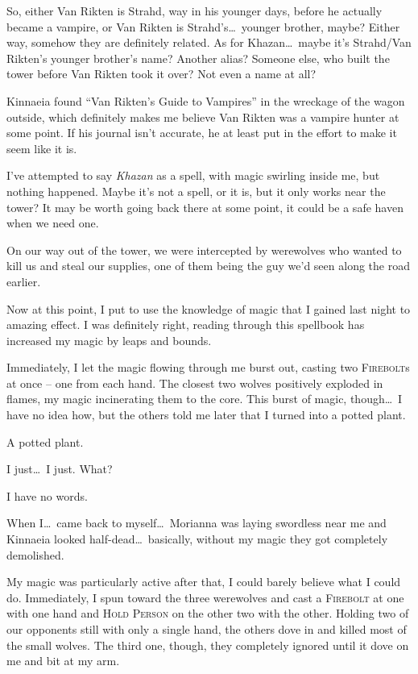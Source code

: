 So, either Van Rikten is Strahd, way in his younger days, before he actually became a vampire, or Van Rikten is Strahd's\dots\ younger brother, maybe? Either way, somehow they are definitely related. As for Khazan\dots\ maybe it's Strahd/Van Rikten's younger brother's name? Another alias? Someone else, who built the tower before Van Rikten took it over? Not even a name at all?

Kinnaeia found ``Van Rikten's Guide to Vampires'' in the wreckage of the wagon outside, which definitely makes me believe Van Rikten was a vampire hunter at some point. If his journal isn't accurate, he at least put in the effort to make it seem like it is.

I've attempted to say \emph{Khazan} as a spell, with magic swirling inside me, but nothing happened. Maybe it's not a spell, or it is, but it only works near the tower? It may be worth going back there at some point, it could be a safe haven when we need one.

On our way out of the tower, we were intercepted by werewolves who wanted to kill us and steal our supplies, one of them being the guy we'd seen along the road earlier.

Now at this point, I put to use the knowledge of magic that I gained last night to amazing effect. I was definitely right, reading through this spellbook has increased my magic by leaps and bounds.

Immediately, I let the magic flowing through me burst out, casting two \textsc{Firebolt}s at once -- one from each hand. The closest two wolves positively exploded in flames, my magic incinerating them to the core. This burst of magic, though\dots\ I have no idea how, but the others told me later that I turned into a potted plant.

A potted plant.

I just\dots\ I just. What?

I have no words.

When I\dots\ came back to myself\dots\ Morianna was laying swordless near me and Kinnaeia looked half-dead\dots\ basically, without my magic they got completely demolished.

My magic was particularly active after that, I could barely believe what I could do. Immediately, I spun toward the three werewolves and cast a \textsc{Firebolt} at one with one hand and \textsc{Hold Person} on the other two with the other. Holding two of our opponents still with only a single hand, the others dove in and killed most of the small wolves. The third one, though, they completely ignored until it dove on me and bit at my arm.

